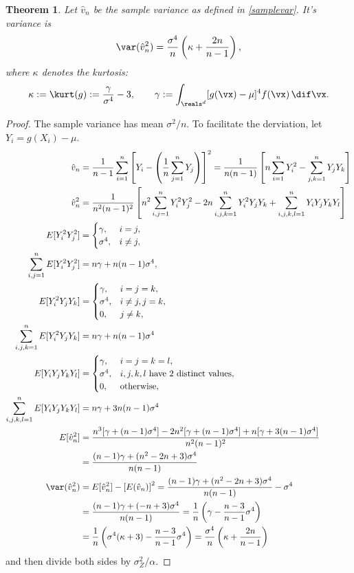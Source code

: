\documentclass[12pt]{amsart}
\newcommand{\hv}{\hat{v}}
\newtheorem{theorem}{Theorem}
\begin{document}
\begin{theorem} \label{Varvarthm} Let $\hv_n$ be the sample variance as defined in \eqref{samplevar}.  It's variance is
\[
\var(\hv_n^2) = \frac{\sigma^4}{n} \left ( \kappa  + \frac{2n}{n-1}\right),
\]
where $\kappa$ denotes the \emph{kurtosis}:
\begin{equation} \label{kurtdef}
\kappa := \kurt(g) := \frac{\gamma}{\sigma^4} -3 , \qquad \gamma := \int_{\reals^d} [g(\vx)-\mu]^4 f(\vx) \, \dif \vx.
\end{equation}
\end{theorem}
\begin{proof}The sample variance has mean $\sigma^2/n$.  To facilitate the derviation, let $Y_i=g(X_i) - \mu$.
\begin{align*}
\hv_n & =  \frac 1{n-1} \sum_{i=1}^n \left[Y_i- \left(\frac 1n \sum_{j=1}^n Y_j\right) \right]^2
=  \frac 1{n(n-1)}\left[ n \sum_{i=1}^n Y^2_i-  \sum_{j,k=1}^n Y_jY_k \right] \\
\hv_n^2 & = \frac 1{n^2(n-1)^2}\left[ n^2 \sum_{i,j=1}^n Y^2_i Y^2_j  - 2 n \sum_{i,j,k=1}^n Y^2_i Y_j Y_k +  \sum_{i,j,k,l=1}^n Y_iY_j Y_k Y_l\right] \\
E[ Y^2_i Y^2_j] & = \begin{cases} \gamma, & i=j,\\
\sigma^4, & i \ne j,
\end{cases}\\
\sum_{i,j=1}^n E[Y^2_i Y^2_j]&= n \gamma + n(n-1)\sigma^4, \\
E[ Y^2_i Y_j Y_k] & = \begin{cases} \gamma, & i=j=k,\\
\sigma^4, & i \ne j, j=k,\\
0, & j \ne k,
\end{cases} \\
\sum_{i,j,k=1}^n E[Y^2_i Y_j Y_k] &= n\gamma  + n(n-1)\sigma^4 \\
E[ Y_i Y_j Y_k Y_l] & = \begin{cases} \gamma, & i=j=k=l,\\
\sigma^4, & i, j, k, l \text{ have 2 distinct values},\\
0, & \text{otherwise},
\end{cases}\\
\sum_{i,j,k,l=1}^n E[Y_iY_j Y_k Y_l] &= n \gamma + 3n(n-1)\sigma^4 \\
E[\hv_n^2] & = \frac{ n^3[\gamma + (n-1)\sigma^4]  - 2 n^2 [\gamma + (n-1)\sigma^4] +  n[\gamma + 3(n-1)\sigma^4]} {n^2(n-1)^2} \\
& = \frac{ (n-1)\gamma + (n^2-2n+3)\sigma^4} {n(n-1)} \\
\var(\hv_n^2) & = E[\hv_n^2] - \left[E(\hv_n)\right]^2 = \frac{ (n-1)\gamma + (n^2-2n+3)\sigma^4} {n(n-1)} -\sigma^4\\
& = \frac{(n-1)\gamma + (-n+3)\sigma^4} {n(n-1)}= \frac{1}{n} \left ( \gamma - \frac{n-3}{n-1} \sigma^4 \right)\\
& = \frac{1}{n} \left ( \sigma^4(\kappa +3) - \frac{n-3}{n-1} \sigma^4 \right) = \frac{\sigma^4}{n} \left ( \kappa  + \frac{2n}{n-1}\right)
\end{align*}
and then divide both sides by $\sigma^2_Z/\alpha$.
\end{proof}
\end{document}
